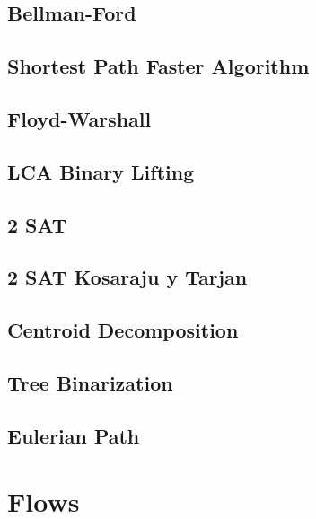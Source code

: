 \subsection{Bellman-Ford}
\raggedbottom
\hrulefill
\subsection{Shortest Path Faster Algorithm}
\raggedbottom
\hrulefill
\subsection{Floyd-Warshall}
\raggedbottom
\hrulefill
\subsection{LCA Binary Lifting}
\raggedbottom
\hrulefill
\subsection{2 SAT}
\raggedbottom
\hrulefill
\subsection{2 SAT Kosaraju y Tarjan}
\raggedbottom
\hrulefill
\subsection{Centroid Decomposition}
\raggedbottom
\hrulefill
\subsection{Tree Binarization}
\raggedbottom
\hrulefill
\subsection{Eulerian Path}
\raggedbottom
\hrulefill

\section{Flows}
